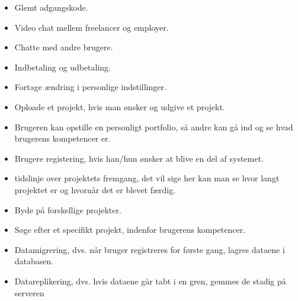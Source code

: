 \begin{itemize}  
    \item Glemt adgangskode.
    \item Video chat mellem freelancer og employer.
    \item Chatte med andre brugere.
    \item Indbetaling og udbetaling.
    \item Fortage ændring i personlige indstillinger. 
    \item Oploade et projekt, hvis man ønsker og udgive et projekt. 
    \item Brugeren kan opstille en personligt portfolio, så andre kan  gå ind og se hvad brugerens kompetencer er.
    \item Brugere registering, hvis han/hun ønsker at blive en del af systemet.
    \item tidslinje over projektets fremgang, det vil sige her kan man se hvor langt projektet er og hvornår det er blevet færdig.
    \item Byde på forskellige projekter. 
    \item Søge efter et specifikt projekt, indenfor brugerens kompetencer.  
    \item Datamigrering, dvs. når bruger registreres for første gang, lagres dataene i databasen.
    \item Datareplikering, dvs. hvis dataene går tabt i en gren, gemmes de stadig på serveren
\end{itemize}